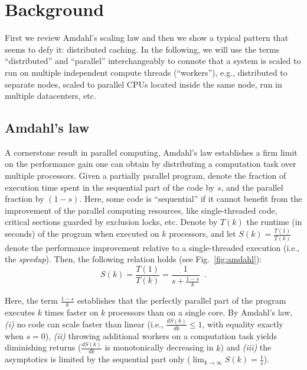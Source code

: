 \section{Background}\label{sec:background}

First we review Amdahl's scaling law and then we show a typical pattern that seems to defy it: distributed caching. In the following, we will use the terms ``distributed'' and ``parallel'' interchangeably to connote that a system is scaled to run on multiple independent compute threads (``workers''), e.g., distributed to separate nodes, scaled to parallel CPUs located inside the same node, run in multiple datacenters, etc.

\subsection{Amdahl's law}
\label{sec:amdahl-law}

A cornerstone result in parallel computing, Amdahl's law \cite{10.1145/1465482.1465560} establishes a firm limit on the performance gain one can obtain by distributing a computation task over multiple processors. Given a partially parallel program, denote the fraction of execution time spent %
in the sequential part of the code by $s$, and the parallel fraction by $(1-s)$. Here, some code is ``sequential'' if it cannot benefit from the improvement of the parallel computing resources, like single-threaded code, critical sections guarded by exclusion locks, etc. Denote by $T(k)$ the runtime (in seconds) of the program when executed on $k$ processors, and let $S(k)=\frac{T(1)}{T(k)}$ denote the performance improvement relative to a single-threaded execution (i.e., the \emph{speedup}). Then, the following relation holds (see Fig.~\ref{fig:amdahl}):
\begin{equation}\label{eq:amdahl}
S(k) = \frac{T(1)}{T(k)} = \frac{1}{s + \frac{1-s}{k}} \enspace .
\end{equation}

Here, the term $\frac{1-s}{k}$ establishes that the perfectly parallel part of the program executes $k$ times faster on $k$ processors than on a single core. By Amdahl's law, \emph{(i)} no code can scale faster than linear (i.e., $\frac{d S(k)}{d k} \le 1$, with equality exactly when $s=0$), \emph{(ii)} throwing additional workers on a computation task yields diminishing returns ($\frac{d S(k)}{d k}$ is monotonically decreasing in $k$) and \emph{(iii)} the asymptotics is limited by the sequential part only ($\lim_{k\to \infty}S(k) = \frac1{s}$). 

